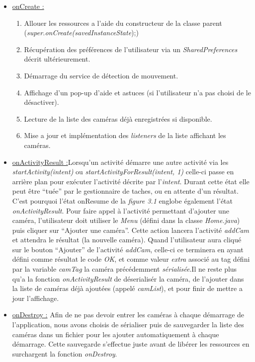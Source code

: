 \begin{itemize}
  \item   \underline{onCreate :} \begin{enumerate}
    \item Allouer les ressources a l'aide du constructeur de la classe parent
    (\textit{super.onCreate(savedInstanceState});)
    \item Récupération des préférences de l'utilisateur via un
    \textit{SharedPreferences} décrit ultérieurement.
    \item Démarrage du service de détection de mouvement.
    \item Affichage d'un pop-up d'aide et astuces (si l'utilisateur n'a pas
    choisi de le désactiver).
    \item Lecture de la liste des caméras déjà enregistrées si disponible.
    \item Mise a jour et implémentation des \textit{listeners} de la liste
    affichant les caméras.\newline
  \end{enumerate} 
  \item \underline{ onActivityResult :}\newline Lorsqu'un activité démarre une
  autre activité via les \textit{startActivity(intent)} ou
  \textit{startActivityForResult(intent, 1)} celle-ci passe en arrière plan pour
  exécuter l'activité décrite par l'\textit{intent}. Durant cette état elle peut
  être ``tuée'' par le gestionnaire de taches, ou en attente d'un résultat. C'est pourquoi l'état
  onResume de la \textit{figure 3.1} englobe également l'état
  \textit{onActivityResult}.\newline
  Pour faire appel à l'activité permettant d'ajouter une caméra, l'utilisateur
  doit utiliser le \textit{Menu} (défini dans la classe \textit{Home.java}) puis
  cliquer sur ``Ajouter une caméra''. Cette action lancera l'activité
  \textit{addCam} et attendra le résultat (la nouvelle caméra).
  \newline Quand l'utilisateur aura cliqué sur le bouton ``Ajouter'' de
  l'activité \textit{addCam}, celle-ci ce terminera en ayant défini comme
  résultat le code \textit{OK}, et comme valeur \textit{extra} associé au tag
  défini par la variable\textit{ camTag} la caméra
  précédemment \textit{sérialisée}.\newline Il ne reste plus qu'a la fonction
  \textit{onActivityResult} de déserialisér la caméra, de l'ajouter dans la
  liste de caméras déjà ajoutées (appelé \textit{camList}), et pour finir de
  mettre a jour l'affichage.\newline
  
  \item \underline{onDestroy :}\newline
  Afin de ne pas devoir entrer les caméras à chaque démarrage de
  l'application, nous avons choisis de sérialiser puis de sauvegarder la liste
  des caméras dans un fichier pour les ajouter automatiquement à chaque
  démarrage. Cette sauvegarde s'effectue juste avant de libérer les ressources
  en surchargent la fonction \textit{onDestroy}. 
  \end{itemize}
  
